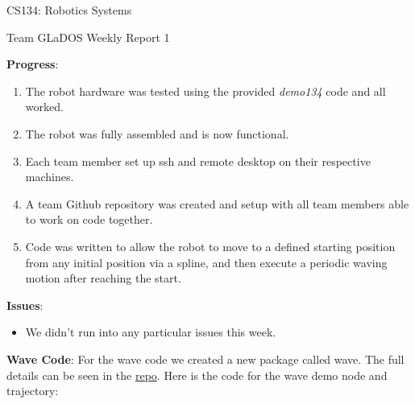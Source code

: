 \documentclass[12 pt]{article}
\newcommand{\setnum}{1}
\begin{document}
\begin{center}
    \Large \color{blue} CS134: Robotics Systems\color{black}
    \begin{center}\normalsize Team GLaDOS Weekly Report \setnum{}\end{center}
    \noindent{\color{black} \rule{\linewidth}{0.5mm} }
\end{center}

\noindent
\textbf{Progress}:
\begin{enumerate}
    \item The robot hardware was tested using the provided \emph{demo134} code and 
    all worked.
    \item The robot was fully assembled and is now functional.
    \item Each team member set up ssh and remote desktop on their respective machines.
    \item A team Github repository was created and setup with all team members able 
    to work on code together.
    \item Code was written to allow the robot to move to a defined starting position 
    from any initial position via a spline, and then execute a periodic waving motion 
    after reaching the start.
\end{enumerate}
\textbf{Issues}:
\begin{itemize}
    \item We didn't run into any particular issues this week.
\end{itemize}
\textbf{Wave Code}:
For the wave code we created a new package called wave. The full details can be
seen in the \href{https://github.com/LeoBJenkins/GLaDOS}{repo}. Here is the code
for the wave demo node and trajectory:
\small

\end{document}
